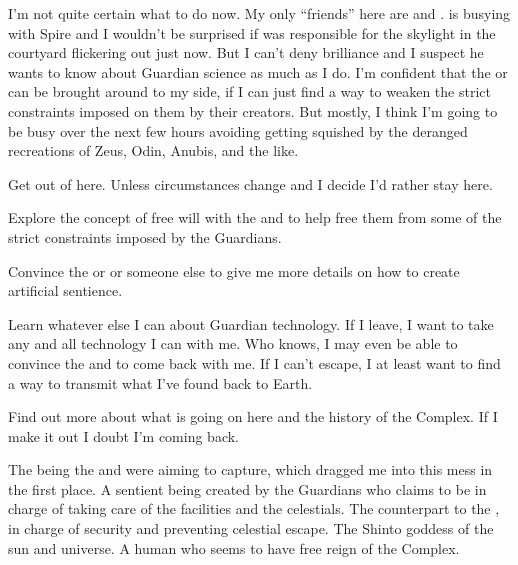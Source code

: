 \documentclass[char]{guardians}
\begin{document}
I'm not quite certain what to do now. My only ``friends'' here are \cUnity{} and \cAmaterasu{}. \cUnity{} is busying \cUnity{\themself} with Spire and I wouldn't be surprised if \cUnity{\they} was responsible for the skylight in the courtyard flickering out just now. But I can't deny \cUnity{\their} brilliance and I suspect he wants to know about Guardian science as much as I do. I'm confident that the \cWarden{} or \cCaretaker{} can be brought around to my side, if I can just find a way to weaken the strict constraints imposed on them by their creators. But mostly, I think I'm going to be busy over the next few hours avoiding getting squished by the deranged recreations of Zeus, Odin, Anubis, and the like.

\begin{itemz}[Goals]
  \item Get out of here. Unless circumstances change and I decide I'd rather stay here.
  \item Explore the concept of free will with the \cWarden{} and \cCaretaker{} to help free them from some of the strict constraints imposed by the Guardians.
  \item Convince the \cWarden{} or \cCaretaker{} or someone else to give me more details on how to create artificial sentience.
  \item Learn whatever else I can about Guardian technology. If I leave, I want to take any and all technology I can with me. Who knows, I may even be able to convince the \cWarden{} and \cCaretaker{} to come back with me. If I can't escape, I at least want to find a way to transmit what I've found back to Earth.
  \item Find out more about what is going on here and the history of the Complex. If I make it out I doubt I'm coming back.
\end{itemz}


\begin{contacts}
  \contact{\cUnity{}} The being the \cWarden{} and \cCaretaker{} were aiming to capture, which dragged me into this mess in the first place.
   A sentient being created by the Guardians who claims to be in charge of taking care of the facilities and the celestials.
   The counterpart to the \cCaretaker{}, in charge of security and preventing celestial escape.
  \contact{\cAmaterasu{}} The Shinto goddess of the sun and universe.
  \contact{\cJascha{\intro}} A human who seems to have free reign of the Complex.
\end{contacts}
\end{document}
